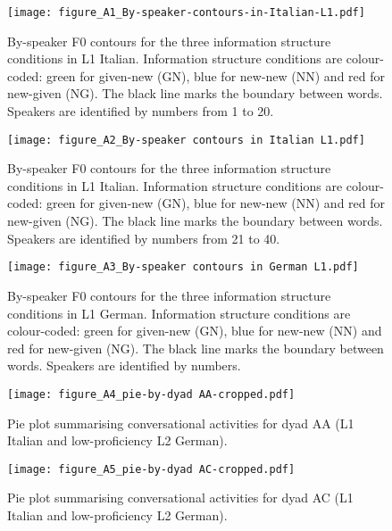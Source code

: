 \graphicspath{{figures/plots-appendix}}
\label{chap:appendix}
\renewcommand{\thefigure}{A\arabic{figure}}

\begin{figure}
\texttt{[image: figure\_A1\_By-speaker-contours-in-Italian-L1.pdf]}
\caption{By-speaker F0 contours for the three information structure conditions in L1 Italian. Information structure conditions are colour-coded: green for given-new (GN), blue for new-new (NN) and red for new-given (NG). The black line marks the boundary between words. Speakers are identified by numbers from 1 to 20.}
\label{fig:A1}
\end{figure}

\begin{figure}
\texttt{[image: figure\_A2\_By-speaker contours in Italian L1.pdf]}
\caption{By-speaker F0 contours for the three information structure conditions in L1 Italian. Information structure conditions are colour-coded: green for given-new (GN), blue for new-new (NN) and red for new-given (NG). The black line marks the boundary between words. Speakers are identified by numbers from 21 to 40.}
\label{fig:A2}
\end{figure}
 
\begin{figure}
\texttt{[image: figure\_A3\_By-speaker contours in German L1.pdf]}
\caption{By-speaker F0 contours for the three information structure conditions in L1 German. Information structure conditions are colour-coded: green for given-new (GN), blue for new-new (NN) and red for new-given (NG). The black line marks the boundary between words. Speakers are identified by numbers.}
\label{fig:A3}
\end{figure}
 
\begin{figure}
\texttt{[image: figure\_A4\_pie-by-dyad AA-cropped.pdf]}
\caption{Pie plot summarising conversational activities for dyad AA (L1 Italian and low-proficiency L2 German).}
\label{fig:A4}
\end{figure}

\begin{figure}
\texttt{[image: figure\_A5\_pie-by-dyad AC-cropped.pdf]}
\caption{Pie plot summarising conversational activities for dyad AC (L1 Italian and low-proficiency L2 German).}
\label{fig:A5}
\end{figure}

